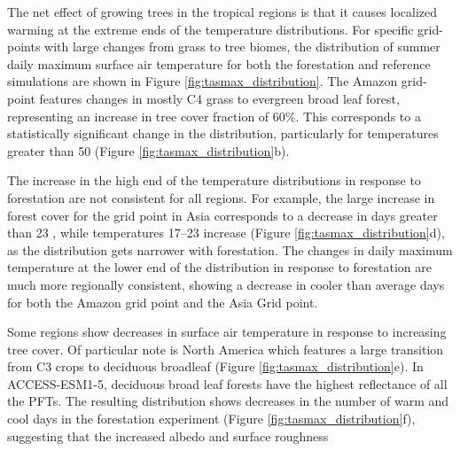 \documentclass[]{article}
\begin{document}
The net effect of growing trees in the tropical regions is that it causes localized warming at the extreme ends of the temperature distributions.
For specific grid-points with large changes from grass to tree biomes, the distribution of summer daily maximum surface air temperature for both the forestation and reference simulations are shown in Figure \ref{fig:tasmax_distribution}.
The Amazon grid-point features changes in mostly C4 grass to evergreen broad leaf forest, representing an increase in tree cover fraction of 60\%.
This corresponds to a statistically significant change in the distribution, particularly for temperatures greater than 50 \textcelsius{} (Figure \ref{fig:tasmax_distribution}b).

The increase in the high end of the temperature distributions in response to forestation are not consistent for all regions.
For example, the large increase in forest cover for the grid point in Asia corresponds to a decrease in days greater than 23 \textcelsius{}, while temperatures 17--23 \textcelsius{} increase (Figure \ref{fig:tasmax_distribution}d), as the distribution gets narrower with forestation.
The changes in daily maximum temperature at the lower end of the distribution in response to forestation are much more regionally consistent, showing a decrease in cooler than average days for both the Amazon grid point and the Asia Grid point.

Some regions show decreases in surface air temperature in response to increasing tree cover.
Of particular note is North America which features a large transition from C3 crops to deciduous broadleaf (Figure \ref{fig:tasmax_distribution}e).
In ACCESS-ESM1-5, deciduous broad leaf forests have the highest reflectance of all the PFTs.
The resulting distribution shows decreases in the number of warm and cool days in the forestation experiment (Figure \ref{fig:tasmax_distribution}f), suggesting that the increased albedo and surface roughness 
\end{document}
